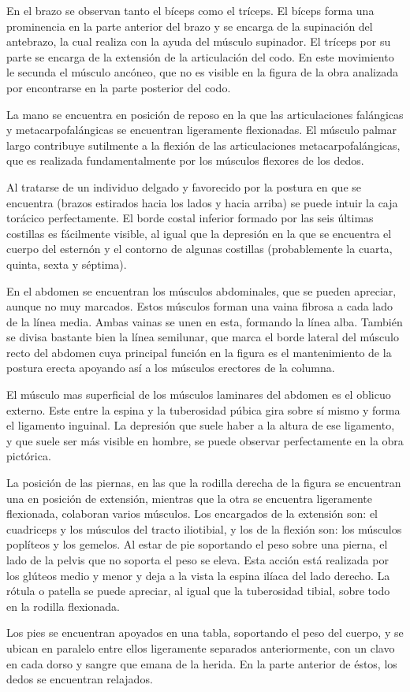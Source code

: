 En el brazo se observan tanto el bíceps como el tríceps. El bíceps forma una prominencia en la parte anterior del brazo y se encarga de la supinación del antebrazo, la cual realiza con la ayuda del músculo supinador. El tríceps por su parte se encarga de la extensión de la articulación del codo. En este movimiento le secunda el músculo ancóneo, que no es visible en la figura de la obra analizada por encontrarse en la parte posterior del codo.

La mano se encuentra en posición de reposo en la que las articulaciones falángicas y metacarpofalángicas se encuentran ligeramente flexionadas. El músculo palmar largo contribuye sutilmente a la flexión de las articulaciones metacarpofalángicas, que es realizada fundamentalmente por los músculos flexores de los dedos.

Al tratarse de un individuo delgado y favorecido por la postura en que se encuentra (brazos estirados hacia los lados y hacia arriba) se puede intuir la caja torácico perfectamente. El borde costal inferior formado por las seis últimas costillas es fácilmente visible, al igual que la depresión en la que se encuentra el cuerpo del esternón y el contorno de algunas costillas (probablemente la cuarta, quinta, sexta y séptima).

En el abdomen se encuentran los músculos abdominales, que se pueden apreciar, aunque no muy marcados. Estos músculos forman una vaina fibrosa a cada lado de la línea media. Ambas vainas se unen en esta, formando la línea alba. También se divisa bastante bien la línea semilunar, que marca el borde lateral del músculo recto del abdomen cuya principal función en la figura es el mantenimiento de la postura erecta apoyando así a los músculos erectores de la columna.

El músculo mas superficial de los músculos laminares del abdomen es el oblicuo externo. Este entre la espina y la tuberosidad púbica gira sobre sí mismo y forma el ligamento inguinal. La depresión que suele haber a la altura de ese ligamento, y que suele ser más visible en hombre, se puede observar perfectamente en la obra pictórica.

La posición de las piernas, en las que la rodilla derecha de la figura se encuentran una en posición de extensión, mientras que la otra se encuentra ligeramente flexionada, colaboran varios músculos. Los encargados de la extensión son: el cuadriceps y los músculos del tracto iliotibial, y los de la flexión son: los músculos poplíteos y los gemelos. Al estar de pie soportando el peso sobre una pierna, el lado de la pelvis que no soporta el peso se eleva. Esta acción está realizada por los glúteos medio y menor y deja a la vista la espina ilíaca del lado derecho.
La rótula o patella se puede apreciar, al igual que la tuberosidad tibial, sobre todo en la rodilla flexionada.

Los pies se encuentran apoyados en una tabla, soportando el peso del cuerpo, y se ubican en paralelo entre ellos ligeramente separados anteriormente, con un clavo en cada dorso y sangre que emana de la herida. En la parte anterior de éstos, los dedos se encuentran relajados.
